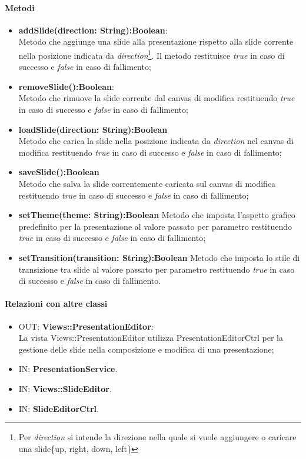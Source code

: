 	\paragraph{Metodi}
	\begin{itemize}
		\item \textbf{addSlide(direction: String):Boolean}:\\
			Metodo che aggiunge una slide alla presentazione rispetto alla slide corrente nella posizione indicata da \textit{direction}\footnote{Per \textit{direction} si intende la direzione nella quale si vuole aggiungere o caricare una slide\{up, right, down, left\}}. Il metodo restituisce \textit{true} in caso di successo e \textit{false} in caso di fallimento;
		\item \textbf{removeSlide():Boolean}:\\
			Metodo che rimuove la slide corrente dal canvas di modifica restituendo \textit{true} in caso di successo e \textit{false} in caso di fallimento;
		\item \textbf{loadSlide(direction: String):Boolean}\\
			Metodo che carica la slide nella posizione indicata da \textit{direction} nel canvas di modifica restituendo \textit{true} in caso di successo e \textit{false} in caso di fallimento;
		\item \textbf{saveSlide():Boolean}\\
			Metodo che salva la slide correntemente caricata sul canvas di modifica restituendo \textit{true} in caso di successo e \textit{false} in caso di fallimento;
		\item \textbf{setTheme(theme: String):Boolean}
			Metodo che imposta l'aspetto grafico predefinito per la presentazione al valore passato per parametro restituendo \textit{true} in caso di successo e \textit{false} in caso di fallimento;
		\item \textbf{setTransition(transition: String):Boolean}
			Metodo che imposta lo stile di transizione tra slide al valore passato per parametro restituendo \textit{true} in caso di successo e \textit{false} in caso di fallimento.
	\end{itemize}
	\paragraph{Relazioni con altre classi}
	\begin{itemize}
	  \item OUT: \textbf{Views::PresentationEditor}:\\
		La vista Views::PresentationEditor utilizza PresentationEditorCtrl per la gestione delle slide nella composizione e modifica di una presentazione;	
	  \item IN: \textbf{PresentationService}.
	  \item IN: \textbf{Views::SlideEditor}.
	  \item IN: \textbf{SlideEditorCtrl}.
	\end{itemize}  
\newpage
